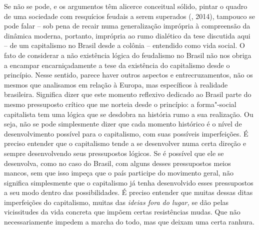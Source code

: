 {Se não se
pode, e os argumentos têm alicerce conceitual sólido, pintar o quadro de
uma sociedade com resquícios feudais a serem superados (, 2014),
tampouco se pode falar -- sob pena de recair numa generalização
imprópria à compreensão da dinâmica moderna, portanto, imprópria ao rumo
dialético da tese discutida aqui -- de um capitalismo no Brasil desde a colônia
-- entendido como vida social. O fato de considerar a não
existência lógica do feudalismo no Brasil não nos obriga a encampar
encarniçadamente a tese da existência do capitalismo desde o princípio.
Nesse sentido, parece haver outros aspectos e entrecruzamentos, não os
mesmos que analisamos em relação à Europa, mas específicos à realidade
brasileira. Significa dizer que este momento reflexivo dedicado ao Brasil parte do
mesmo pressuposto crítico que me norteia desde o princípio: a
forma"-social capitalista tem uma lógica que se desdobra na história rumo
a sua realização. Ou seja, não se pode simplesmente dizer que cada
momento histórico é o nível de desenvolvimento possível para o
capitalismo, com suas possíveis imperfeições. É preciso entender que o
capitalismo tende a se desenvolver numa certa direção e sempre
desenvolvendo seus pressupostos lógicos. Se é possível que ele se
desenvolva, como no caso do Brasil, com alguns desses pressupostos
meios mancos, sem que isso impeça que o país participe do movimento
geral, não significa simplesmente que o capitalismo já tenha
desenvolvido esses pressupostos a seu modo dentro das possibilidades. É
preciso entender que muitas dessas ditas imperfeições do capitalismo,
muitas das \emph{ideias fora do lugar,} se dão pelas vicissitudes da
vida concreta que impõem certas resistências mudas. Que não
necessariamente impedem a marcha do todo, mas que deixam uma certa
ranhura.

}
